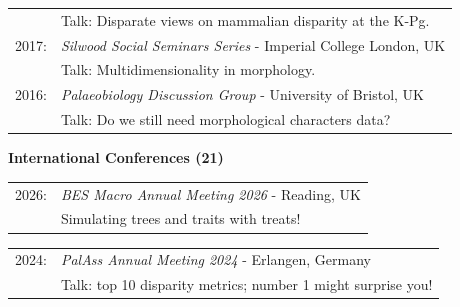 \documentclass[10pt,a4paper]{article}
\begin{document}
{\begin{tabular}{ll}
      & Talk: Disparate views on mammalian disparity at the K-Pg.\\ 
2017: & \textit{Silwood Social Seminars Series} - Imperial College London, UK\\
      & Talk: Multidimensionality in morphology.\\ 
2016: & \textit{Palaeobiology Discussion Group} - University of Bristol, UK\\
      & Talk: Do we still need morphological characters data?\\ 
\end{tabular}

\bigskip

\raggedright\textbf{International Conferences (21)}\\[1.5ex]


\begin{tabular}{ll}
2026: & \textit{BES Macro Annual Meeting 2026} - Reading, UK\\
      & Simulating trees and traits with treats!\\
\end{tabular}


\begin{tabular}{ll}
2024: & \textit{PalAss Annual Meeting 2024} - Erlangen, Germany\\
      & Talk: top 10 disparity metrics; number 1 might surprise you!\\
\end{tabular}

}
\end{document}
